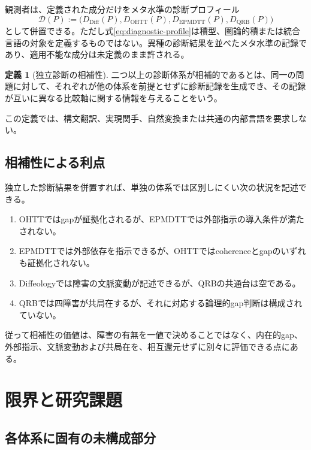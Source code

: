 \documentclass[a4paper,11pt]{ltjsarticle}
\theoremstyle{definition}
\newtheorem{definition}{定義}[section]
\theoremstyle{plain}
\newcommand{\QRB}{\mathrm{QRB}}
\newcommand{\OHTT}{\mathrm{OHTT}}
\newcommand{\EPMDTT}{\mathrm{EPMDTT}}
\begin{document}
観測者は、定義された成分だけをメタ水準の診断プロフィール
\begin{equation}
 \mathcal D(P)
 :=\bigl(
 D_{\mathrm{Diff}}(P),
 D_{\OHTT}(P),
 D_{\EPMDTT}(P),
 D_{\QRB}(P)
 \bigr)
 \label{eq:diagnostic-profile}
\end{equation}
として併置できる。ただし式\eqref{eq:diagnostic-profile}は積型、圏論的積または統合言語の対象を定義するものではない。異種の診断結果を並べたメタ水準の記録であり、適用不能な成分は未定義のまま許される。

\begin{definition}[独立診断の相補性]
二つ以上の診断体系が相補的であるとは、同一の問題に対して、それぞれが他の体系を前提とせずに診断記録を生成でき、その記録が互いに異なる比較軸に関する情報を与えることをいう。
\end{definition}

この定義では、構文翻訳、実現関手、自然変換または共通の内部言語を要求しない。

\subsection{相補性による利点}

独立した診断結果を併置すれば、単独の体系では区別しにくい次の状況を記述できる。
\begin{enumerate}
 \item OHTTではgapが証拠化されるが、EPMDTTでは外部指示の導入条件が満たされない。
 \item EPMDTTでは外部依存を指示できるが、OHTTではcoherenceとgapのいずれも証拠化されない。
 \item Diffeologyでは障害の文脈変動が記述できるが、QRBの共通台は空である。
 \item QRBでは四障害が共局在するが、それに対応する論理的gap判断は構成されていない。
\end{enumerate}

従って相補性の価値は、障害の有無を一値で決めることではなく、内在的gap、外部指示、文脈変動および共局在を、相互還元せずに別々に評価できる点にある。

\section{限界と研究課題}

\subsection{各体系に固有の未構成部分}
\end{document}
